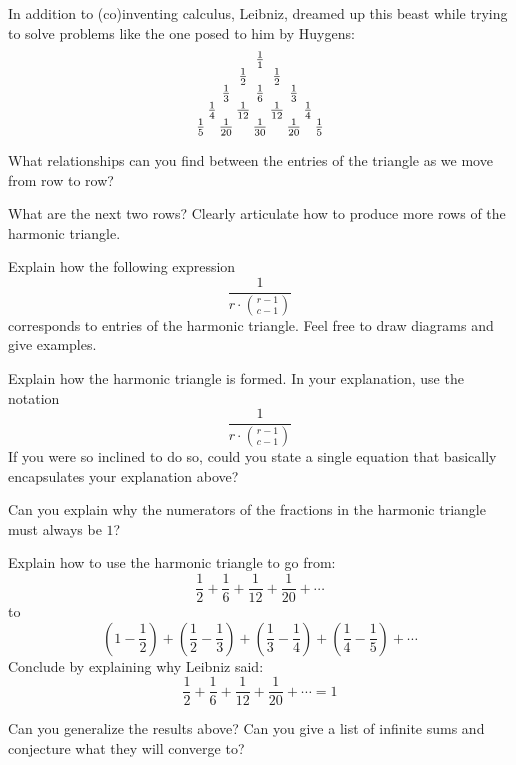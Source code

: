 \documentclass[nooutcomes]{ximera}
\begin{document}
In addition to (co)inventing calculus, Leibniz, dreamed up this beast
while trying to solve problems like the one posed to him by Huygens:
\[
\begin{array}{@{\,}c@{\,}c@{\,}c@{\,}c@{\,}c@{\,}c@{\,}c@{\,}c@{\,}c@{\,}}
& & & & \frac{1}{1} & & & & \\
& & & \frac{1}{2} & & \frac{1}{2} & & & \\
& & \frac{1}{3} & & \frac{1}{6} & & \frac{1}{3} & & \\
& \frac{1}{4} & & \frac{1}{12} & & \frac{1}{12} & & \frac{1}{4} &\\
\frac{1}{5} & & \frac{1}{20} & & \frac{1}{30} & & \frac{1}{20} & & \frac{1}{5}
\end{array}
\]

\begin{question} 
What relationships can you find between the entries of the triangle as
we move from row to row?
\end{question}


\begin{question} 
What are the next two rows? Clearly articulate how to produce more
rows of the harmonic triangle.
\end{question}

\begin{question} Explain how the following expression
\[
\frac{1}{r\cdot\binom{r-1}{c-1}}
\]
corresponds to entries of the harmonic triangle. Feel free to draw
diagrams and give examples.
\end{question}

\begin{question}  
Explain how the harmonic triangle is formed. In your explanation, use
the notation
\[
\frac{1}{r\cdot\binom{r-1}{c-1}}
\]
If you were so inclined to do so, could you state a single equation
that basically encapsulates your explanation above?
\end{question}

\begin{question} 
Can you explain why the numerators of the fractions in the harmonic
triangle must always be $1$?
\end{question}


\begin{question} Explain how to use the harmonic triangle to go from:
\[
\frac{1}{2} + \frac{1}{6} + \frac{1}{12} + \frac{1}{20}+\cdots
\]
to
\[
\left(1 - \frac{1}{2}\right) + \left(\frac{1}{2}-\frac{1}{3}\right) + 
\left(\frac{1}{3}- \frac{1}{4}\right) + \left(\frac{1}{4}-\frac{1}{5}\right) + \cdots 
\]
Conclude by explaining why Leibniz said:
\[
\frac{1}{2} + \frac{1}{6} + \frac{1}{12} + \frac{1}{20}+\cdots = 1
\]
\end{question}

\begin{question} 
Can you generalize the results above? Can you give a list of infinite
sums and conjecture what they will converge to?
\end{question}
\end{document}
